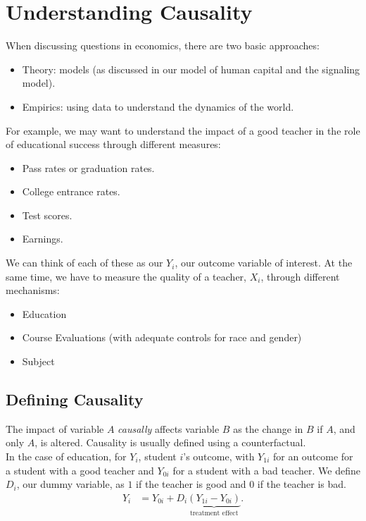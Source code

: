 \documentclass[10pt]{extarticle}
\begin{document}
  \section{Understanding Causality}%
  When discussing questions in economics, there are two basic approaches:
  \begin{itemize}
    \item Theory: models (as discussed in our model of human capital and the signaling model).
    \item Empirics: using data to understand the dynamics of the world.
  \end{itemize}
  For example, we may want to understand the impact of a good teacher in the role of educational success through different measures:
  \begin{itemize}
    \item Pass rates or graduation rates.
    \item College entrance rates.
    \item Test scores.
    \item Earnings.
  \end{itemize}
  We can think of each of these as our $Y_i$, our outcome variable of interest. At the same time, we have to measure the quality of a teacher, $X_i$, through different mechanisms:
  \begin{itemize}
    \item Education
    \item Course Evaluations (with adequate controls for race and gender)
    \item Subject
  \end{itemize}
  \subsection{Defining Causality}%
  The impact of variable $A$ \textit{causally} affects variable $B$ as the change in $B$ if $A$, and only $A$, is altered. Causality is usually defined using a counterfactual.\\

  In the case of education, for $Y_i$, student $i$'s outcome, with $Y_{1i}$ for an outcome for a student with a good teacher and $Y_{0i}$ for a student with a bad teacher. We define $D_i$, our dummy variable, as $1$ if the teacher is good and $0$ if the teacher is bad.
  \begin{align*}
    Y_i &= Y_{0i} + D_i\underbrace{(Y_{1i} - Y_{0i})}_{\text{treatment effect}}.
  \end{align*}
\end{document}
